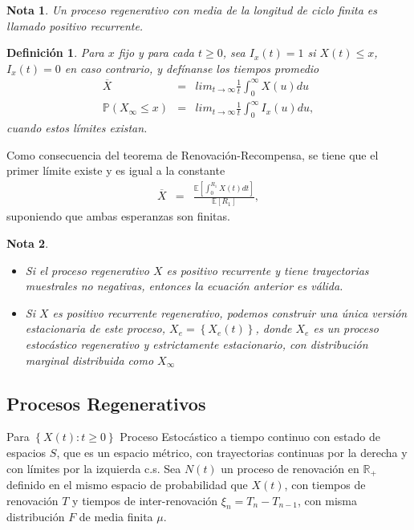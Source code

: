 \documentclass{article}
\newtheorem{Def}{Definición}
\newtheorem{Note}{Nota}
\newcommand{\rea}{\mathbb{R}}
\newcommand{\esp}{\mathbb{E}}
\newcommand{\prob}{\mathbb{P}}
\begin{document}
\begin{Note}
Un proceso regenerativo con media de la longitud de ciclo finita es llamado positivo recurrente.
\end{Note}


\begin{Def}
Para $x$ fijo y para cada $t\geq0$, sea $I_{x}\left(t\right)=1$ si $X\left(t\right)\leq x$,  $I_{x}\left(t\right)=0$ en caso contrario, y def\'inanse los tiempos promedio
\begin{eqnarray*}
\overline{X}&=&lim_{t\rightarrow\infty}\frac{1}{t}\int_{0}^{\infty}X\left(u\right)du\\
\prob\left(X_{\infty}\leq x\right)&=&lim_{t\rightarrow\infty}\frac{1}{t}\int_{0}^{\infty}I_{x}\left(u\right)du,
\end{eqnarray*}
cuando estos l\'imites existan.
\end{Def}

Como consecuencia del teorema de Renovaci\'on-Recompensa, se tiene que el primer l\'imite  existe y es igual a la constante
\begin{eqnarray*}
\overline{X}&=&\frac{\esp\left[\int_{0}^{R_{1}}X\left(t\right)dt\right]}{\esp\left[R_{1}\right]},
\end{eqnarray*}
suponiendo que ambas esperanzas son finitas.

\begin{Note}
\begin{itemize}
\item[a)] Si el proceso regenerativo $X$ es positivo recurrente y tiene trayectorias muestrales no negativas, entonces la ecuaci\'on anterior es v\'alida.
\item[b)] Si $X$ es positivo recurrente regenerativo, podemos construir una \'unica versi\'on estacionaria de este proceso, $X_{e}=\left\{X_{e}\left(t\right)\right\}$, donde $X_{e}$ es un proceso estoc\'astico regenerativo y estrictamente estacionario, con distribuci\'on marginal distribuida como $X_{\infty}$
\end{itemize}
\end{Note}

\subsection{Procesos Regenerativos}

Para $\left\{X\left(t\right):t\geq0\right\}$ Proceso Estoc\'astico a tiempo continuo con estado de espacios $S$, que es un espacio m\'etrico, con trayectorias continuas por la derecha y con l\'imites por la izquierda c.s. Sea $N\left(t\right)$ un proceso de renovaci\'on en $\rea_{+}$ definido en el mismo espacio de probabilidad que $X\left(t\right)$, con tiempos de renovaci\'on $T$ y tiempos de inter-renovaci\'on $\xi_{n}=T_{n}-T_{n-1}$, con misma distribuci\'on $F$ de media finita $\mu$.
\end{document}
